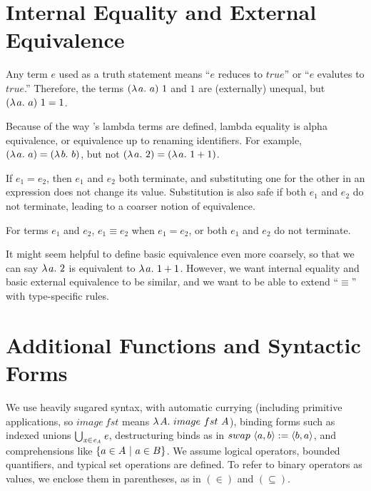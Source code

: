 \section{Internal Equality and External Equivalence}

Any \lzfclang term $\mathit{e}$ used as a truth statement means ``$\mathit{e}$ reduces to $true$'' or ``$\mathit{e}$ evalutes to $true$.''
Therefore, the terms $(\lambda\mspace{2mu}{a}\ldotp\,{a})~1$ and $1$ are (externally) unequal, but $(\lambda\mspace{2mu}{a}\ldotp\,{a})~1 = 1$.

Because of the way \lzfclang's lambda terms are defined, lambda equality is alpha equivalence, or equivalence up to renaming identifiers.
For example, $(\lambda\mspace{2mu}{a}\ldotp\,{a}) = (\lambda\mspace{2mu}{b}\ldotp\,{b})$, but not $(\lambda\mspace{2mu}{a}\ldotp\,{2}) = (\lambda\mspace{2mu}{a}\ldotp\,{1+1})$.

If $\mathit{e}_1 = \mathit{e}_2$, then $\mathit{e}_1$ and $\mathit{e}_2$ both terminate, and substituting one for the other in an expression does not change its value.
Substitution is also safe if both $\mathit{e}_1$ and $\mathit{e}_2$ do not terminate, leading to a coarser notion of equivalence.

\begin{definition}
For terms $\mathit{e_1}$ and $\mathit{e_2}$, $\mathit{e_1} \equiv \mathit{e_2}$ when $\mathit{e_1} = \mathit{e_2}$, or both $\mathit{e_1}$ and $\mathit{e_2}$ do not terminate.
\end{definition}

It might seem helpful to define basic equivalence even more coarsely, so that we can say $\lambda\mspace{2mu}{a}\ldotp\, 2$ is equivalent to $\lambda\mspace{2mu}{a}\ldotp\,{1+1}$.
However, we want internal equality and basic external equivalence to be similar, and we want to be able to extend ``$\equiv$'' with type-specific rules.

\section{Additional Functions and Syntactic Forms}

We use heavily sugared syntax, with automatic currying (including primitive applications, so $image~fst$ means $\lambda\mspace{2mu}{A}\ldotp\, image~fst~A$), binding forms such as indexed unions $\textstyle\bigcup_{\mathit{x} \in \mathit{e_A}}\mathit{e}$, destructuring binds as in $swap~\langle{a,b}\rangle := \langle{b,a}\rangle$, and comprehensions like $\lbrace {a \in A} \ \lvert\ {a \in B} \rbrace$.
We assume logical operators, bounded quantifiers, and typical set operations are defined.
To refer to binary operators as values, we enclose them in parentheses, as in $(\in)$ and $(\subseteq)$.

